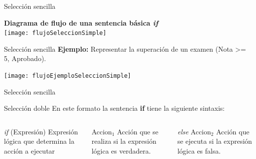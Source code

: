 \begin{frame}[t]{Selección sencilla}
\begin{center}
\textbf{\large{Diagrama de flujo de una sentencia básica \textit{if}}}\\
\vspace{2mm}
\texttt{[image: flujoSeleccionSimple]}
\end{center}
\end{frame}
\begin{frame}[t]{Selección sencilla}
\textbf{Ejemplo:} Representar la superación de un examen (Nota >= 5, Aprobado).\\
\vspace{2mm}
\begin{center}
	\texttt{[image: flujoEjemploSeleccionSimple]}
\end{center}
\end{frame}

\begin{frame}[fragile]{Selección sencilla}

\end{frame}



\begin{frame}{Selección doble}
En este formato la sentencia \textbf{if} tiene la siguiente sintaxis:\\
\vspace{5mm}
\begin{columns}
	\begin{column}{0.33 \textwidth}
			\begin{block}{\textit{if} (Expresión)}
		Expresión lógica que determina la acción a ejecutar
		\end{block}	
	\end{column}
	\begin{column}{0.33 \textwidth}
		\begin{block}{Accion$ _{1} $}
			Acción que se realiza si la expresión lógica es verdadera.
		\end{block}	
	\end{column}
	\begin{column}{0.33 \textwidth}
		\begin{block}{\textit{else} Accion$ _2 $}
			Acción que se ejecuta si la expresión lógica es falsa.
		\end{block}
	\end{column}
\end{columns}
\end{frame}

